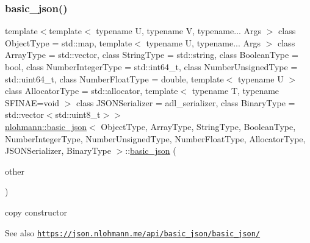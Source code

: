 \subsubsection{\texorpdfstring{basic\+\_\+json()}{basic\_json()}\hspace{0.1cm}{\footnotesize\ttfamily [8/9]}}
{\footnotesize\ttfamily template$<$template$<$ typename U, typename V, typename... Args $>$ class Object\+Type = std\+::map, template$<$ typename U, typename... Args $>$ class Array\+Type = std\+::vector, class String\+Type  = std\+::string, class Boolean\+Type  = bool, class Number\+Integer\+Type  = std\+::int64\+\_\+t, class Number\+Unsigned\+Type  = std\+::uint64\+\_\+t, class Number\+Float\+Type  = double, template$<$ typename U $>$ class Allocator\+Type = std\+::allocator, template$<$ typename T, typename S\+F\+I\+N\+A\+E=void $>$ class J\+S\+O\+N\+Serializer = adl\+\_\+serializer, class Binary\+Type  = std\+::vector$<$std\+::uint8\+\_\+t$>$$>$ \\
\hyperlink{classnlohmann_1_1basic__json}{nlohmann\+::basic\+\_\+json}$<$ Object\+Type, Array\+Type, String\+Type, Boolean\+Type, Number\+Integer\+Type, Number\+Unsigned\+Type, Number\+Float\+Type, Allocator\+Type, J\+S\+O\+N\+Serializer, Binary\+Type $>$\+::\hyperlink{classnlohmann_1_1basic__json}{basic\+\_\+json} (\begin{DoxyParamCaption}\item[{const \hyperlink{classnlohmann_1_1basic__json}{basic\+\_\+json}$<$ Object\+Type, Array\+Type, String\+Type, Boolean\+Type, Number\+Integer\+Type, Number\+Unsigned\+Type, Number\+Float\+Type, Allocator\+Type, J\+S\+O\+N\+Serializer, Binary\+Type $>$ \&}]{other }\end{DoxyParamCaption})\hspace{0.3cm}{\ttfamily [inline]}}



copy constructor 

\begin{DoxySeeAlso}{See also}
\href{https://json.nlohmann.me/api/basic_json/basic_json/}{\tt https\+://json.\+nlohmann.\+me/api/basic\+\_\+json/basic\+\_\+json/} 
\end{DoxySeeAlso}
\mbox{\label{classnlohmann_1_1basic__json_a642afd9d8886e0dedfc0d5cee2baf57f}} 
